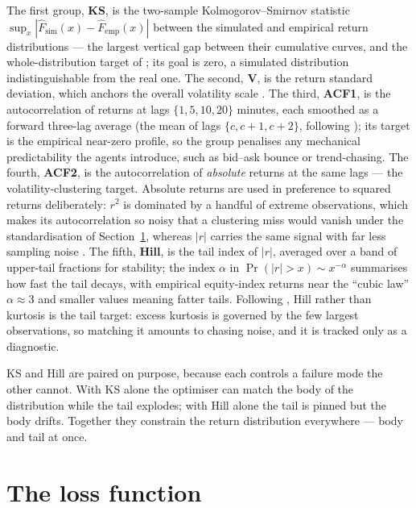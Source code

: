 The first group, \textbf{KS}, is the two-sample Kolmogorov--Smirnov statistic
$\sup_x |\widehat F_{\mathrm{sim}}(x) - \widehat F_{\mathrm{emp}}(x)|$ between the
simulated and empirical return distributions --- the largest vertical gap
between their cumulative curves, and the whole-distribution target of
\citet{gao_2022_xgb}; its goal is zero, a simulated distribution indistinguishable
from the real one. The second, \textbf{V}, is the return standard deviation,
which anchors the overall volatility scale \citep{gao_2022_hfabm}. The third,
\textbf{ACF1}, is the autocorrelation of returns at lags $\{1,5,10,20\}$ minutes,
each smoothed as a forward three-lag average (the mean of lags $\{c,c{+}1,c{+}2\}$,
following \citealp{gao_2022_xgb}); its target is the empirical near-zero profile,
so the group penalises any mechanical predictability the agents introduce, such
as bid--ask bounce or trend-chasing. The fourth, \textbf{ACF2}, is the
autocorrelation of \emph{absolute} returns at the same lags --- the
volatility-clustering target. Absolute returns are used in preference to squared
returns deliberately: $r^2$ is dominated by a handful of extreme observations,
which makes its autocorrelation so noisy that a clustering miss would vanish
under the standardisation of Section~\ref{sec:cal-loss}, whereas $|r|$ carries
the same signal with far less sampling noise \citep{cont_2001}. The fifth,
\textbf{Hill}, is the \citet{hill_1975} tail index of $|r|$, averaged over a band
of upper-tail fractions for stability; the index $\alpha$ in
$\Pr(|r|>x)\sim x^{-\alpha}$ summarises how fast the tail decays, with empirical
equity-index returns near the ``cubic law'' $\alpha\approx 3$ and smaller values
meaning fatter tails. Following \citet{gao_2022_hfabm}, Hill rather than kurtosis
is the tail target: excess kurtosis is governed by the few largest observations,
so matching it amounts to chasing noise, and it is tracked only as a diagnostic.

KS and Hill are paired on purpose, because each controls a failure mode the
other cannot. With KS alone the optimiser can match the body of the distribution
while the tail explodes; with Hill alone the tail is pinned but the body drifts.
Together they constrain the return distribution everywhere --- body and tail at
once.



\section{The loss function}
\label{sec:cal-loss}

